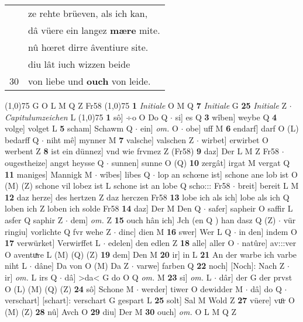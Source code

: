 \documentclass[8pt,a4paper,notitlepage]{article}
\begin{document}
\begin{table}[ht]
\begin{minipage}[t]{0.5\linewidth}
\begin{tabular}{rl}
 & ze rehte brüeven, als ich kan,\\ 
 & dâ vüere ein langez \textbf{mære} mite.\\ 
 & nû hœret dirre âventiure site.\\ 
 & diu lât iuch wizzen beide\\ 
30 & von liebe und \textbf{ouch} von leide.\\ 
\end{tabular}
\scriptsize
\line(1,0){75} \newline
G O L M Q Z Fr58 \newline
\line(1,0){75} \newline
\textbf{1} \textit{Initiale} O M Q  \textbf{7} \textit{Initiale} G  \textbf{25} \textit{Initiale} Z   $\cdot$ \textit{Capitulumzeichen} L  \newline
\line(1,0){75} \newline
\textbf{1} sô] ÷o O Do Q  $\cdot$ si] es Q \textbf{3} wîben] weybe Q \textbf{4} volge] volget L \textbf{5} scham] Schawm Q  $\cdot$ ein] \textit{om.} O  $\cdot$ obe] uff M \textbf{6} endarf] darf O (L) bedarff Q  $\cdot$ niht mê] mynner M \textbf{7} valsche] valschen Z  $\cdot$ wirbet] erwirbet O werbent Z \textbf{8} ist ein dünnez] vnd wie frvmez Z (Fr58) \textbf{9} daz] Der L M Z Fr58  $\cdot$ ougestheize] angst heysse Q  $\cdot$ sunnen] sunne O (Q) \textbf{10} zergât] irgat M vergat Q \textbf{11} maniges] Mannigk M  $\cdot$ wîbes] libes Q  $\cdot$ lop an schœne ist] schone ane lob ist O (M) (Z) schone vil lobez ist L schone ist an lobe Q scho::: Fr58  $\cdot$ breit] bereit L M \textbf{12} daz herze] des hertzen Z daz herczen Fr58 \textbf{13} lobe ich als ich] lobe als ich Q loben ich Z loben ich solde Fr58 \textbf{14} daz] Der M Den Q  $\cdot$ safer] sapheir O saffir L asfer Q saphir Z  $\cdot$ dem] \textit{om.} Z \textbf{15} ouch hân ich] Jch (en Q ) han dasz Q (Z)  $\cdot$ vür ringiu] vorlichte Q fvr wehe Z  $\cdot$ dinc] dien M \textbf{16} swer] Wer L Q  $\cdot$ in den] indem O \textbf{17} verwürket] Verwirffet L  $\cdot$ edelen] den edlen Z \textbf{18} alle] aller O  $\cdot$ natûre] av:::ver O aventuͯre L (M) (Q) (Z) \textbf{19} dem] Den M \textbf{20} ir] in L \textbf{21} An der warbe ich varbe niht L  $\cdot$ dâne] Da von O (M) Da Z  $\cdot$ varwe] farben Q \textbf{22} noch] [Noch]: Nach Z  $\cdot$ ir] \textit{om.} L irs Q  $\cdot$ dâ] >da< G do O Q \textit{om.} M \textbf{23} si] \textit{om.} L  $\cdot$ dâr] der G der prvst O (L) (M) (Q) (Z) \textbf{24} sô] Schone M  $\cdot$ werder] tiwer O dewidder M  $\cdot$ dâ] do Q  $\cdot$ verschart] [schart]: verschart G gespart L \textbf{25} solt] Sal M Wold Z \textbf{27} vüere] vuͦr O (M) (Z) \textbf{28} nû] Avch O \textbf{29} diu] Der M \textbf{30} ouch] \textit{om.} O L M Q Z \newline

\end{minipage}
\end{table}
\end{document}
